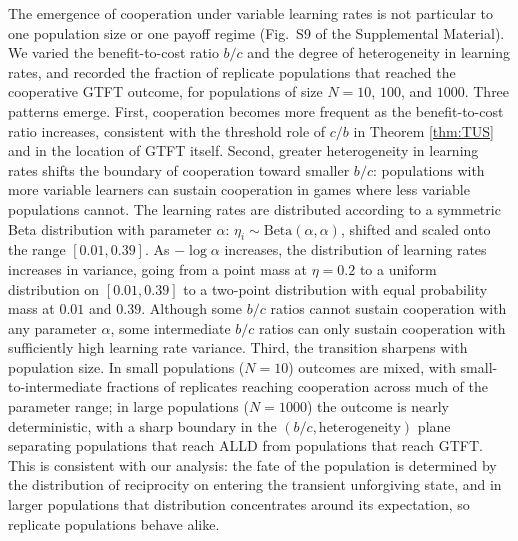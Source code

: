\documentclass[10pt]{article}
\makeatletter
\renewcommand\section{\@startsection{section}{1}{\z@}{-3ex \@plus -1ex \@minus -.2ex}{1.2ex \@plus .2ex}{\sffamily\bfseries\Large}}
\makeatother
\begin{document}
The emergence of cooperation under variable learning rates is not particular to one population size or one payoff regime (Fig.~S9 of the Supplemental Material). We varied the benefit-to-cost ratio $b/c$ and the degree of heterogeneity in learning rates, and recorded the fraction of replicate populations that reached the cooperative GTFT outcome, for populations of size $N = 10$, $100$, and $1000$. Three patterns emerge. First, cooperation becomes more frequent as the benefit-to-cost ratio increases, consistent with the threshold role of $c/b$ in Theorem \ref{thm:TUS} and in the location of GTFT itself. Second, greater heterogeneity in learning rates shifts the boundary of cooperation toward smaller $b/c$: populations with more variable learners can sustain cooperation in games where less variable populations cannot. The learning rates are distributed according to a symmetric Beta distribution with parameter $\alpha$: $\eta_i \sim \mathrm{Beta}(\alpha, \alpha)$, shifted and scaled onto the range $[0.01, 0.39]$. As $-\log\alpha$ increases, the distribution of learning rates increases in variance, going from a point mass at $\eta = 0.2$ to a uniform distribution on $[0.01, 0.39]$ to a two-point distribution with equal probability mass at $0.01$ and $0.39$. Although some $b/c$ ratios cannot sustain cooperation with any parameter $\alpha$, some intermediate $b/c$ ratios can only sustain cooperation with sufficiently high learning rate variance. Third, the transition sharpens with population size. In small populations ($N = 10$) outcomes are mixed, with small-to-intermediate fractions of replicates reaching cooperation across much of the parameter range; in large populations ($N = 1000$) the outcome is nearly deterministic, with a sharp boundary in the $(b/c, \text{heterogeneity})$ plane separating populations that reach ALLD from populations that reach GTFT. This is consistent with our analysis: the fate of the population is determined by the distribution of reciprocity on entering the transient unforgiving state, and in larger populations that distribution concentrates around its expectation, so replicate populations behave alike.

\section{Discussion}
\end{document}
